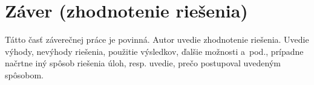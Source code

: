 \section{Z\'aver (zhodnotenie rie\v{s}enia)}

Tátto časť\/ záverečnej práce je povinná. Autor uvedie zhodnotenie
riešenia. Uvedie výhody, nevýhody riešenia,  použitie výsledkov, ďalšie
možnosti a~pod., prípadne načrtne iný spôsob riešenia úloh, resp.
uvedie, prečo postupoval uvedeným spôsobom.
